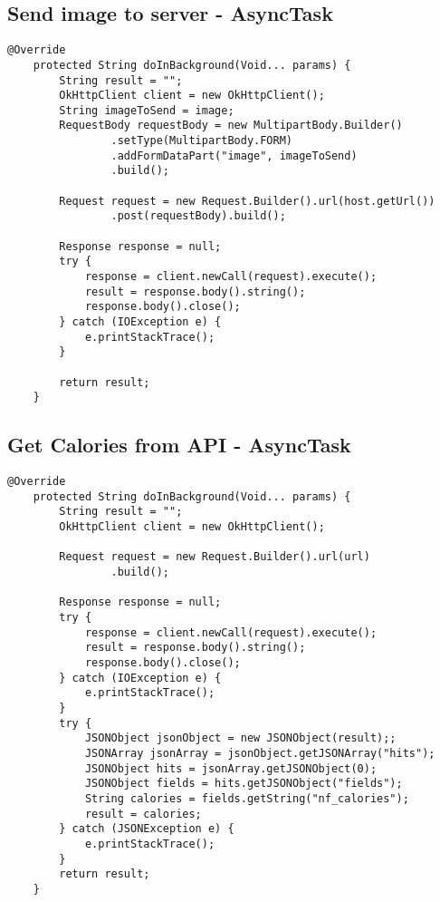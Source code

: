 \subsection*{Send image to server - AsyncTask}
\begin{lstlisting}[style=Java]
 	@Override
    protected String doInBackground(Void... params) {
        String result = "";
        OkHttpClient client = new OkHttpClient();
        String imageToSend = image;
        RequestBody requestBody = new MultipartBody.Builder()
                .setType(MultipartBody.FORM)
                .addFormDataPart("image", imageToSend)
                .build();

        Request request = new Request.Builder().url(host.getUrl())
                .post(requestBody).build();

        Response response = null;
        try {
            response = client.newCall(request).execute();
            result = response.body().string();
            response.body().close();
        } catch (IOException e) {
            e.printStackTrace();
        }

        return result;
    }
\end{lstlisting}



\subsection*{Get Calories from API - AsyncTask}
\begin{lstlisting}[style=Java]
 	@Override
    protected String doInBackground(Void... params) {
        String result = "";
        OkHttpClient client = new OkHttpClient();

        Request request = new Request.Builder().url(url)
                .build();

        Response response = null;
        try {
            response = client.newCall(request).execute();
            result = response.body().string();
            response.body().close();
        } catch (IOException e) {
            e.printStackTrace();
        }
        try {
            JSONObject jsonObject = new JSONObject(result);;
            JSONArray jsonArray = jsonObject.getJSONArray("hits");
            JSONObject hits = jsonArray.getJSONObject(0);
            JSONObject fields = hits.getJSONObject("fields");
            String calories = fields.getString("nf_calories");
            result = calories;
        } catch (JSONException e) {
            e.printStackTrace();
        }
        return result;
    }
\end{lstlisting}



